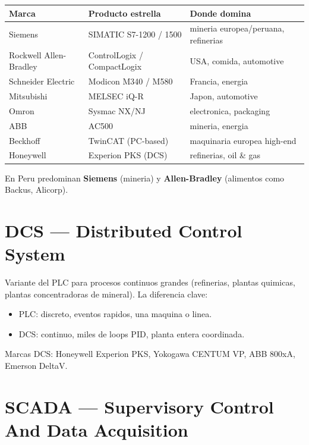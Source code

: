 \documentclass[11pt,a4paper,oneside]{report}
\begin{document}
\begin{center}
\begin{tabular}{lll}
\toprule
\textbf{Marca} & \textbf{Producto estrella} & \textbf{Donde domina} \\
\midrule
Siemens               & SIMATIC S7-1200 / 1500   & mineria europea/peruana, refinerias \\
Rockwell Allen-Bradley & ControlLogix / CompactLogix & USA, comida, automotive \\
Schneider Electric    & Modicon M340 / M580      & Francia, energia \\
Mitsubishi            & MELSEC iQ-R              & Japon, automotive \\
Omron                 & Sysmac NX/NJ             & electronica, packaging \\
ABB                   & AC500                    & mineria, energia \\
Beckhoff              & TwinCAT (PC-based)       & maquinaria europea high-end \\
Honeywell             & Experion PKS (DCS)       & refinerias, oil \& gas \\
\bottomrule
\end{tabular}
\end{center}

En Peru predominan \textbf{Siemens} (mineria) y \textbf{Allen-Bradley}
(alimentos como Backus, Alicorp).

\section{DCS --- Distributed Control System}

Variante del PLC para procesos continuos grandes (refinerias, plantas
quimicas, plantas concentradoras de mineral). La diferencia clave:

\begin{itemize}[leftmargin=2em]
  \item PLC: discreto, eventos rapidos, una maquina o linea.
  \item DCS: continuo, miles de loops PID, planta entera coordinada.
\end{itemize}

Marcas DCS: Honeywell Experion PKS, Yokogawa CENTUM VP, ABB 800xA,
Emerson DeltaV.

\section{SCADA --- Supervisory Control And Data Acquisition}
\end{document}
